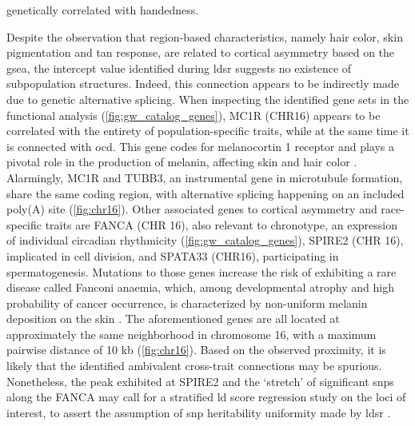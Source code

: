genetically correlated with handedness.

Despite the observation that region-based characteristics, namely hair color, skin pigmentation and tan response, are related to cortical asymmetry based on the \ac{gsea}, the intercept value identified during \ac{ldsr} suggests no existence of subpopulation structures. Indeed, this connection appears to be indirectly made due to genetic alternative splicing. When inspecting the identified gene sets in the functional analysis (\autoref{fig:gw_catalog_genes}), MC1R (CHR16) appears to be correlated with the entirety of population-specific traits, while at the same time it is connected with \ac{ocd}. This gene codes for melanocortin 1 receptor and plays a pivotal role in the production of melanin, affecting skin and hair color \cite{Swope2018}. Alarmingly, MC1R and TUBB3, an instrumental gene in microtubule formation, share the same coding region, with alternative splicing happening on an included poly(A) site \cite{Dalziel2011}(\autoref{fig:chr16}). Other associated genes to cortical asymmetry and race-specific traits are FANCA (CHR 16), also relevant to chronotype, an expression of individual circadian rhythmicity \cite{Takahashi2018} (\autoref{fig:gw_catalog_genes}), SPIRE2 (CHR 16), implicated in cell division, and SPATA33 (CHR16), participating in spermatogenesis. Mutations to those genes increase the risk of exhibiting a rare disease called Fanconi anaemia, which, among developmental atrophy and high probability of cancer occurrence, is characterized by non-uniform melanin deposition on the skin \cite{Visconti2018}. The aforementioned genes are all located at approximately the same neighborhood in chromosome 16, with a maximum pairwise distance of 10 kb (\autoref{fig:chr16}). Based on the observed proximity, it is likely that the identified ambivalent cross-trait connections may be spurious. Nonetheless, the peak exhibited at SPIRE2 and the `stretch' of significant \acp{snp} along the FANCA may call for a stratified \ac{ld} score regression study on the loci of interest, to assert the assumption of \ac{snp} heritability uniformity made by \ac{ldsr} \cite{Finucane2015}.



